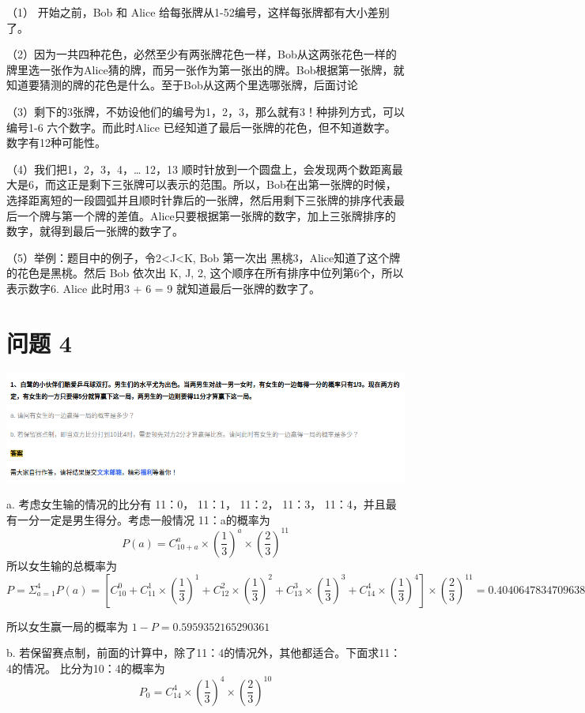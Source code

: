 \documentclass{article}
\begin{document}
（1） 开始之前，Bob 和 Alice 给每张牌从1-52编号，这样每张牌都有大小差别了。

（2）因为一共四种花色，必然至少有两张牌花色一样，Bob从这两张花色一样的牌里选一张作为Alice猜的牌，而另一张作为第一张出的牌。Bob根据第一张牌，就知道要猜测的牌的花色是什么。至于Bob从这两个里选哪张牌，后面讨论

（3）剩下的3张牌，不妨设他们的编号为1，2，3，那么就有3！种排列方式，可以编号1-6 六个数字。而此时Alice 已经知道了最后一张牌的花色，但不知道数字。数字有12种可能性。

（4）我们把1，2，3，4，… 12，13 顺时针放到一个圆盘上，会发现两个数距离最大是6，而这正是剩下三张牌可以表示的范围。所以，Bob在出第一张牌的时候，选择距离短的一段圆弧并且顺时针靠后的一张牌，然后用剩下三张牌的排序代表最后一个牌与第一个牌的差值。Alice只要根据第一张牌的数字，加上三张牌排序的数字，就得到最后一张牌的数字了。

（5）举例：题目中的例子，令2<J<K, Bob 第一次出 黑桃3，Alice知道了这个牌的花色是黑桃。然后 Bob 依次出 K, J, 2, 这个顺序在所有排序中位列第6个，所以表示数字6. Alice 此时用3 + 6 = 9 就知道最后一张牌的数字了。



\newpage
\section{问题 4}
\includegraphics[scale=0.5]{pingpang.png}

a. 考虑女生输的情况的比分有 11：0， 11：1， 11：2， 11：3， 11：4，并且最有一分一定是男生得分。考虑一般情况 11：a的概率为
$$
P(a) = C^a_{10+a} \times (\frac{1}{3})^a \times (\frac{2}{3})^{11}
$$
所以女生输的总概率为
$$
P = \Sigma_{a=1}^{4} P(a) = [C^0_{10} + C^1_{11} \times (\frac{1}{3})^1 + C^2_{12} \times (\frac{1}{3})^2 + C^3_{13} \times (\frac{1}{3})^3 + C^4_{14} \times (\frac{1}{3})^4] \times (\frac{2}{3})^{11} = 0.4040647834709638
$$

所以女生赢一局的概率为 $ 1 - P = 0.5959352165290361 $

\vspace{60pt}

b. 若保留赛点制，前面的计算中，除了11：4的情况外，其他都适合。下面求11：4的情况。
比分为10：4的概率为
$$
P_0 = C^4_{14} \times (\frac{1}{3})^4 \times (\frac{2}{3})^{10}
$$
\end{document}
